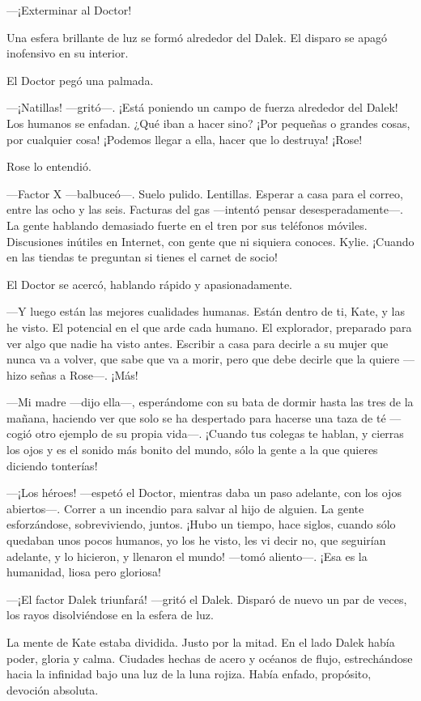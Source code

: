 ---¡Exterminar al Doctor!

Una esfera brillante de luz se formó alrededor del Dalek. El disparo se
apagó inofensivo en su interior.

El Doctor pegó una palmada.

---¡Natillas! ---gritó---. ¡Está poniendo un campo de fuerza alrededor del
Dalek! Los humanos se enfadan. ¿Qué iban a hacer sino? ¡Por pequeñas o
grandes cosas, por cualquier cosa! ¡Podemos llegar a ella, hacer que lo
destruya! ¡Rose!

Rose lo entendió.

---Factor X ---balbuceó---. Suelo pulido. Lentillas. Esperar a casa para el
correo, entre las ocho y las seis. Facturas del gas ---intentó pensar
desesperadamente---. La gente hablando demasiado fuerte en el tren por
sus teléfonos móviles. Discusiones inútiles en Internet, con gente que
ni siquiera conoces. Kylie. ¡Cuando en las tiendas te preguntan si
tienes el carnet de socio!

El Doctor se acercó, hablando rápido y apasionadamente.

---Y luego están las mejores cualidades humanas. Están dentro de ti,
Kate, y las he visto. El potencial en el que arde cada humano. El
explorador, preparado para ver algo que nadie ha visto antes. Escribir a
casa para decirle a su mujer que nunca va a volver, que sabe que va a
morir, pero que debe decirle que la quiere ---hizo señas a Rose---. ¡Más!

---Mi madre ---dijo ella---, esperándome con su bata de dormir hasta las
tres de la mañana, haciendo ver que solo se ha despertado para hacerse
una taza de té ---cogió otro ejemplo de su propia vida---. ¡Cuando tus
colegas te hablan, y cierras los ojos y es el sonido más bonito del
mundo, sólo la gente a la que quieres diciendo tonterías!

---¡Los héroes! ---espetó el Doctor, mientras daba un paso adelante, con
los ojos abiertos---. Correr a un incendio para salvar al hijo de
alguien. La gente esforzándose, sobreviviendo, juntos. ¡Hubo un tiempo,
hace siglos, cuando sólo quedaban unos pocos humanos, yo los he visto,
les vi decir no, que seguirían adelante, y lo hicieron, y llenaron el
mundo! ---tomó aliento---. ¡Esa es la humanidad, liosa pero gloriosa!

---¡El factor Dalek triunfará! ---gritó el Dalek. Disparó de nuevo un par
de veces, los rayos disolviéndose en la esfera de luz.

La mente de Kate estaba dividida. Justo por la mitad. En el lado Dalek
había poder, gloria y calma. Ciudades hechas de acero y océanos de
flujo, estrechándose hacia la infinidad bajo una luz de la luna rojiza.
Había enfado, propósito, devoción absoluta.

